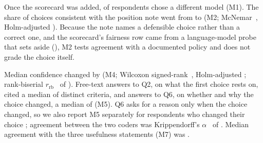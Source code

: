 Once the scorecard was added,  of respondents chose a different model (M1).
The share of choices consistent with the position note went from  to  (M2; McNemar~\cite{mcnemar1947}, Holm-adjusted ).
Because the note names a defensible choice rather than a correct one, and the scorecard's fairness row came from a language-model probe that  sets aside (), M2 tests agreement with a documented policy and does not grade the choice itself.

Median confidence changed by  (M4; Wilcoxon signed-rank~\cite{wilcoxon1945}, Holm-adjusted ; rank-biserial $r_{\mathrm{rb}}$~\cite{kerby2014} of ).
Free-text answers to Q2, on what the first choice rests on, cited a median of  distinct criteria, and answers to Q6, on whether and why the choice changed, a median of  (M5).
Q6 asks for a reason only when the choice changed, so we also report M5 separately for respondents who changed their choice ; agreement between the two coders was Krippendorff's $\alpha$~\cite{hayes2007answering} of .
Median agreement with the three usefulness statements (M7) was .


